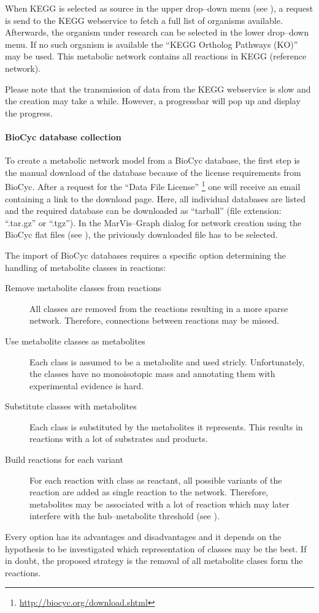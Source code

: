 \documentclass[titlepage,a4paper,twoside]{article}
\newcommand{\mg}{MarVis--Graph\xspace}
\newcommand{\pref}[1]{\prettyref{#1}}
\begin{document}
When KEGG is selected as source in the upper drop--down menu (see
\pref{fig:newnetwork_kegg}), a request is
send to the KEGG webservice to fetch a full list of organisms available.
Afterwards, the organism under research can be selected in the lower
drop--down menu. If no such organism is available the ``KEGG Ortholog Pathways
(KO)'' may be used. This metabolic network contains all reactions in KEGG
(reference network).

Please note that the transmission of data from the KEGG webservice is slow and
the creation may take a while. However, a progressbar will
pop up and display the progress.

\paragraph{BioCyc database collection} \cite{caspi2008metacyc,
caspi2010metacyc,caspi2012metacyc} To create a metabolic network model from
a BioCyc database, the first step is the manual download of the database
because of the license requirements from BioCyc.
After a request for the ``Data File License''
\footnote{\url{http://biocyc.org/download.shtml}} one will receive an email
containing a link to the download page. Here, all individual databases are
listed and the required database can be downloaded as ``tarball'' (file
extension: ``.tar.gz'' or ``.tgz'').
In the \mg dialog for network creation using the BioCyc flat files (see
\pref{fig:newnetwork_biocyc}), the priviously downloaded file has to be selected. 

The import of BioCyc databases requires a specific option determining the
handling of metabolite classes in reactions:
\begin{description}
	\item[Remove metabolite classes from reactions]
		All classes are removed from the reactions resulting in a more sparse
		network. Therefore, connections between reactions may be missed.
	\item[Use metabolite classes as metabolites]
		Each class is assumed to be a metabolite and used stricly. Unfortunately, the classes have no
		monoisotopic mass and annotating them with experimental evidence is hard.
	\item[Substitute classes with metabolites]
		Each class is substituted by the metabolites it represents. This
		results in reactions with a lot of substrates and products.
	\item[Build reactions for each variant]
		For each reaction with class as reactant, all possible variants of the
		reaction are added as single reaction to the network.
		Therefore, metabolites may be associated with a lot of reaction which
		may later interfere with the hub--metabolite threshold (see
		\pref{ssec:calculate}).
\end{description}
Every option has its advantages and disadvantages and it depends on the
hypothesis to be investigated which representation of classes may be the best.
If in doubt, the proposed strategy is the removal of all metabolite clases
form the reactions.
\end{document}
